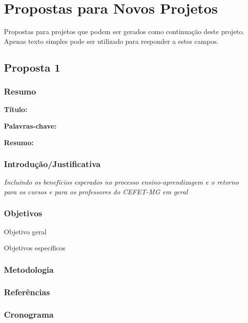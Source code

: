 \chapter{Propostas para Novos Projetos}
\label{cap:propostas_novos_projetos}

Propostas para projetos que podem ser gerados como continuação deste projeto.
Apenas texto simples pode ser utilizado para responder a estes campos.

\section{Proposta 1}

\subsection{Resumo}

\noindent
\textbf{Título:}

\noindent
\textbf{Palavras-chave:}

\noindent
\textbf{Resumo:}

\subsection{Introdução/Justificativa}

\textit{Incluindo os benefícios esperados no processo ensino-aprendizagem e o
retorno para os cursos e para os professores do CEFET-MG em geral}

\subsection{Objetivos}

Objetivo geral

Objetivos específicos

\subsection{Metodologia}

\subsection{Referências}

\subsection{Cronograma}

